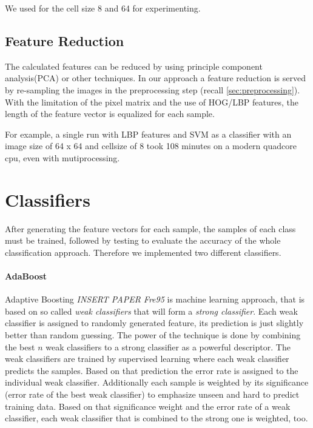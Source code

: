 \documentclass[a4paper,10pt]{article}
\begin{document}
We used for the cell size 8 and 64 for experimenting.

\subsection{Feature Reduction}

The calculated features can be reduced by using principle component analysis(PCA) or other techniques.
In our approach a feature reduction is served by re-sampling the images in the preprocessing step (recall \autoref{sec:preprocessing}).
With the limitation of the pixel matrix and the use of HOG/LBP features, the length of the feature vector is equalized for each sample.

For example, a single run with LBP features and SVM as a classifier with an image size of 64 x 64 and cellsize of 8 took 108 minutes on a modern quadcore cpu, even with mutiprocessing.
\section{Classifiers}

After generating the feature vectors for each sample, the samples of each class must be trained, followed by testing to evaluate the accuracy of the whole classification approach. 
Therefore we implemented two different classifiers. 

\paragraph{AdaBoost}
Adaptive Boosting \emph{INSERT PAPER Fre95} is machine learning approach, that is based on so called \textit{weak classifiers} that will form a \textit{strong classifier}. Each weak classifier is assigned to randomly generated feature, its prediction is just slightly better than random guessing. The power of the technique is done by combining the best $n$ weak classifiers to a strong classifier as a powerful descriptor. The weak classifiers are trained by supervised learning where each weak classifier predicts the samples. Based on that prediction the error rate is assigned to the individual weak classifier. Additionally each sample is weighted by its significance (error rate of the best weak classifier) to emphasize unseen and hard to predict training data. Based on that significance weight and the error rate of a weak classifier, each weak classifier that is combined to the strong one is weighted, too.
\end{document}
